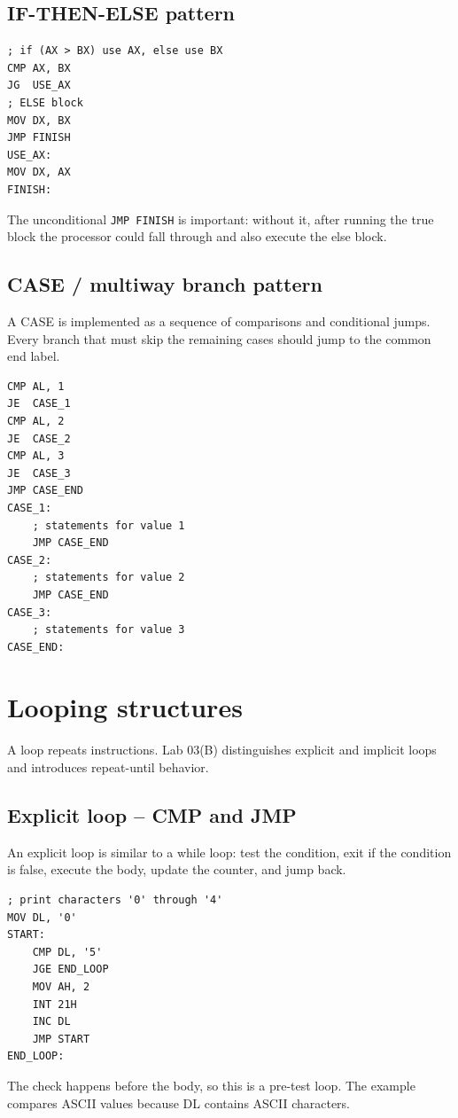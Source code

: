 \documentclass[11pt,a4paper]{article}
\begin{document}
\subsection{IF-THEN-ELSE pattern}
\begin{lstlisting}[style=asm]
; if (AX > BX) use AX, else use BX
CMP AX, BX
JG  USE_AX
; ELSE block
MOV DX, BX
JMP FINISH
USE_AX:
MOV DX, AX
FINISH:
\end{lstlisting}
The unconditional \texttt{JMP FINISH} is important: without it, after running the true block the processor could fall through and also execute the else block.

\subsection{CASE / multiway branch pattern}
A CASE is implemented as a sequence of comparisons and conditional jumps. Every branch that must skip the remaining cases should jump to the common end label.
\begin{lstlisting}[style=asm]
CMP AL, 1
JE  CASE_1
CMP AL, 2
JE  CASE_2
CMP AL, 3
JE  CASE_3
JMP CASE_END
CASE_1:
    ; statements for value 1
    JMP CASE_END
CASE_2:
    ; statements for value 2
    JMP CASE_END
CASE_3:
    ; statements for value 3
CASE_END:
\end{lstlisting}

\section{Looping structures}
A loop repeats instructions. Lab 03(B) distinguishes explicit and implicit loops and introduces repeat-until behavior.

\subsection{Explicit loop -- CMP and JMP}
An explicit loop is similar to a while loop: test the condition, exit if the condition is false, execute the body, update the counter, and jump back.
\begin{lstlisting}[style=asm]
; print characters '0' through '4'
MOV DL, '0'
START:
    CMP DL, '5'
    JGE END_LOOP
    MOV AH, 2
    INT 21H
    INC DL
    JMP START
END_LOOP:
\end{lstlisting}
The check happens before the body, so this is a pre-test loop. The example compares ASCII values because DL contains ASCII characters.
\end{document}
